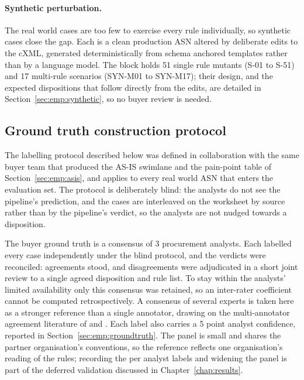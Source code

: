 \paragraph{Synthetic perturbation.} The real world cases are too few to exercise every rule individually, so synthetic cases close the gap. Each is a clean production ASN altered by deliberate edits to the cXML, generated deterministically from schema anchored templates rather than by a language model. The block holds 51 single rule mutants (S-01 to S-51) and 17 multi-rule scenarios (SYN-M01 to SYN-M17); their design, and the expected dispositions that follow directly from the edits, are detailed in Section~\ref{sec:emp:synthetic}, so no buyer review is needed.


\subsection{Ground truth construction protocol}
\label{sec:emp:protocol}

The labelling protocol described below was defined in collaboration with the same buyer team that produced the AS-IS swimlane and the pain-point table of Section~\ref{sec:emp:asis}, and applies to every real world ASN that enters the evaluation set. The protocol is deliberately blind: the analysts do not see the pipeline's prediction, and the cases are interleaved on the worksheet by source rather than by the pipeline's verdict, so the analysts are not nudged towards a disposition.

The buyer ground truth is a consensus of 3 procurement analysts. Each labelled every case independently under the blind protocol, and the verdicts were reconciled: agreements stood, and disagreements were adjudicated in a short joint review to a single agreed disposition and rule list. To stay within the analysts' limited availability only this consensus was retained, so an inter-rater coefficient cannot be computed retrospectively. A consensus of several experts is taken here as a stronger reference than a single annotator, drawing on the multi-annotator agreement literature of \citet{artstein2008} and \citet{fleiss1971}. Each label also carries a 5 point analyst confidence, reported in Section~\ref{sec:emp:groundtruth}. The panel is small and shares the partner organisation's conventions, so the reference reflects one organisation's reading of the rules; recording the per analyst labels and widening the panel is part of the deferred validation discussed in Chapter~\ref{chap:results}.

